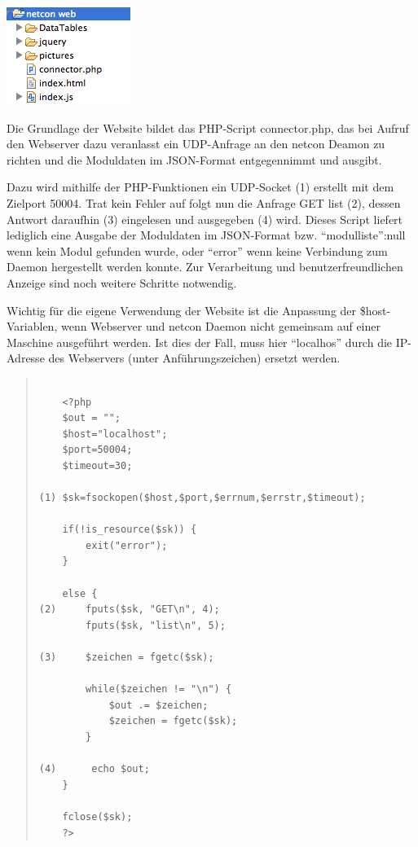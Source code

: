 \documentclass[a4paper,14pt,headsepline]{scrartcl}
\begin{document}
\newpage

\begin{center}
\includegraphics[width=0.20 \paperwidth]{./bilder/website_aufbau.png}
\end{center}

Die Grundlage der Website bildet das PHP-Script connector.php, das bei Aufruf den Webserver dazu veranlasst ein UDP-Anfrage an den netcon Deamon zu richten und die Moduldaten im JSON-Format entgegennimmt und ausgibt. 

Dazu wird mithilfe der PHP-Funktionen ein UDP-Socket (1) erstellt mit dem Zielport 50004. Trat kein Fehler auf folgt nun die Anfrage GET list (2), dessen Antwort daraufhin (3) eingelesen und ausgegeben (4) wird. Dieses Script liefert lediglich eine Ausgabe der Moduldaten im JSON-Format bzw. {``modulliste'':null} wenn kein Modul gefunden wurde, oder ``error'' wenn keine Verbindung zum Daemon hergestellt werden konnte. Zur Verarbeitung und benutzerfreundlichen Anzeige sind noch weitere Schritte notwendig.  

Wichtig für die eigene Verwendung der Website ist die Anpassung der \$host-Variablen, wenn Webserver und netcon Daemon nicht gemeinsam auf einer Maschine ausgeführt werden. Ist dies der Fall, muss hier ``localhos'' durch die IP-Adresse des Webservers (unter Anführungszeichen) ersetzt werden.  

\newpage

\begin{quote}
\begin{verbatim}

    <?php
    $out = "";
    $host="localhost";
    $port=50004;
    $timeout=30;

(1) $sk=fsockopen($host,$port,$errnum,$errstr,$timeout);

    if(!is_resource($sk)) {				
        exit("error");		
    }

    else {					
(2)     fputs($sk, "GET\n", 4);
        fputs($sk, "list\n", 5);
        					
(3)     $zeichen = fgetc($sk);
    				
        while($zeichen != "\n") {
            $out .= $zeichen;
            $zeichen = fgetc($sk);
        }	
    				
(4)      echo $out;					
    }	
		
    fclose($sk);	
    ?>

\end{verbatim}
\end{quote} 
\end{document}
